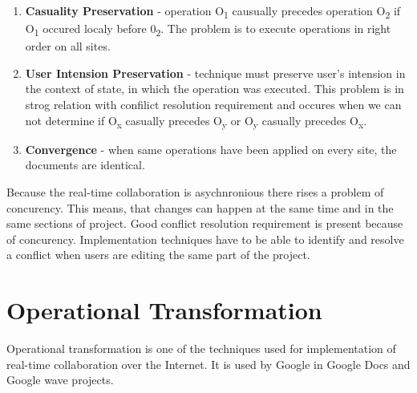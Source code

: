 \documentclass[12pt,oneside,draft]{fithesis2}
\begin{document}
\begin{enumerate}
\item \textbf{Casuality Preservation} - operation O\textsubscript{1} causually precedes operation O\textsubscript{2} if O\textsubscript{1} occured localy before 0\textsubscript{2}. The problem is to execute operations in right order on all sites.
\item \textbf{User Intension Preservation} - technique must preserve user's intension in the context of state, in which the operation was executed. This problem is in strog relation with confilict resolution requirement and occures when we can not determine if O\textsubscript{x} casually precedes O\textsubscript{y} or O\textsubscript{y} casually precedes O\textsubscript{x}.
\item \textbf{Convergence} - when same operations have been applied on every site, the documents are identical.
\end{enumerate}
\par Because the real-time collaboration is asychnronious there rises a problem of concurency. This means, that changes can happen at the same time and in the same sections of project. Good conflict resolution requirement is present because of concurency. Implementation techniques have to be able to identify and resolve a conflict when users are editing the same part of the project.
\section{Operational Transformation}
\par Operational transformation is one of the techniques used for implementation of real-time collaboration over the Internet. It is used by Google in Google Docs and Google wave projects. 
 
 
\end{document}
